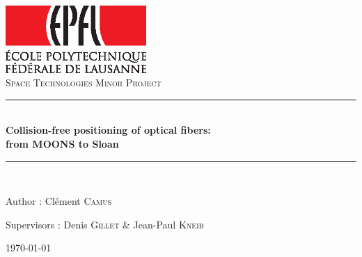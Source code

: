 \newcommand{\HRule}{\rule{\linewidth}{0.5mm}}

\begin{titlepage}
\begin{center}




\vspace*{2.5cm}


\includegraphics[width=0.4\textwidth]{EPFL-Logo-CMJN.eps}\\[1.5cm]


\textsc{\LARGE Space Technologies Minor Project}\\[1.5cm]


\HRule \\[0.4cm]
{ \huge \bfseries Collision-free positioning of optical fibers: \\ from MOONS to Sloan \\[0.4cm] }

\HRule \\[1.5cm]

{\Large 
Author : Clément \textsc{Camus}

\vspace*{0.8cm}

Supervisors : Denis \textsc{Gillet} \& Jean-Paul \textsc{Kneib}}
\vfill


{\large \today}

\end{center}
\end{titlepage}